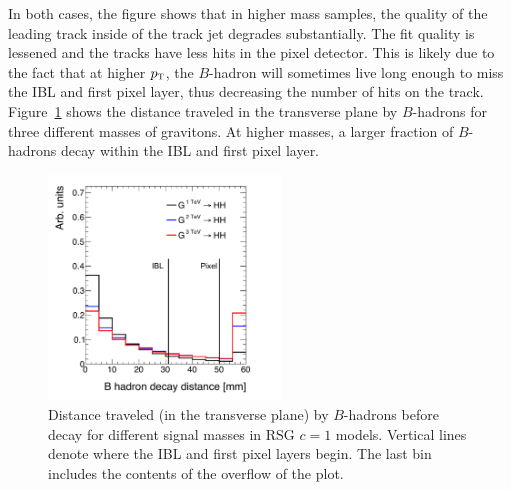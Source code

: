 %
In both cases, the figure shows that in higher mass samples, the quality of the leading track inside of the track jet degrades substantially. The fit quality is lessened and the tracks have less hits in the pixel detector. This is likely due to the fact that at higher $p_{\textrm{\footnotesize\sc t}}$, the $B$-hadron will sometimes live long enough to miss the IBL and first pixel layer, thus decreasing the number of hits on the track. Figure~\ref{fig:b_decay_dist} shows the distance traveled in the transverse plane by $B$-hadrons for three different masses of gravitons. At higher masses, a larger fraction of $B$-hadrons decay within the IBL and first pixel layer. 

\begin{figure}[h!]
  \centering
  \captionsetup{justification=centering}

  \includegraphics[width=0.55\textwidth]{figures/B_decay_dist}
  \caption{Distance traveled (in the transverse plane) by $B$-hadrons before decay for different signal masses in RSG $c=1$ models. Vertical lines denote where the IBL and first pixel layers begin. The last bin includes the contents of the overflow of the plot.}
  \label{fig:b_decay_dist}
\end{figure}


